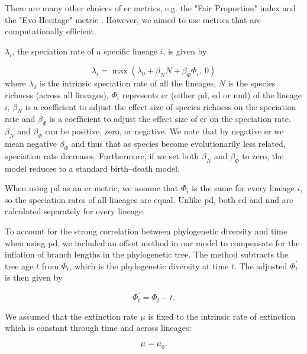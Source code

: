 {There are many other choices of \acrshort{er} metrics, e.g. the "Fair Proportion" index \citep{redding_evolutionarily_2008} and the "Evo-Heritage" metric \citep{rosindell_phylogenetic_2024}. However, we aimed to use metrics that are computationally efficient.

$\lambda_i$, the speciation rate of a specific lineage $i$, is given by

\begin{equation}
\lambda_i=\operatorname{max}{\left(\lambda_0+\beta_NN+\beta_\varPhi\varPhi_i,\ 0\right)}
\label{equation:three}
\end{equation}
where $\lambda_0$ is the intrinsic speciation rate of all the lineages, $N$ is the species richness (across all lineages), $\varPhi_i$ represents \acrshort{er} (either \acrshort{pd}, \acrshort{ed} or \acrshort{nnd}) of the lineage $i$, $\beta_N$ is a coefficient to adjust the effect size of species richness on the speciation rate and $\beta_\varPhi$ is a coefficient to adjust the effect size of \acrshort{er} on the speciation rate. $\beta_N$ and $\beta_\varPhi$ can be positive, zero, or negative. We note that by negative \acrshort{er} we mean negative $\beta_\varPhi$ and thus that as species become evolutionarily less related, speciation rate decreases. Furthermore, if we set both $\beta_N$ and $\beta_\varPhi$ to zero, the model reduces to a standard birth--death model.

When using \acrshort{pd} as an \acrshort{er} metric, we assume that $\varPhi_i$ is the same for every lineage $i$, so the speciation rates of all lineages are equal. Unlike \acrshort{pd}, both \acrshort{ed} and \acrshort{nnd} are calculated separately for every lineage.

To account for the strong correlation between phylogenetic diversity and time when using \acrshort{pd}, we included an offset method in our model to compensate for the inflation of branch lengths in the phylogenetic tree. The method subtracts the tree age $t$ from $\varPhi_t$, which is the phylogenetic diversity at time $t$. The adjusted $\varPhi_t^\prime$ is then given by

\begin{equation}
\varPhi_t^\prime=\varPhi_t-t.
\label{equation:two}
\end{equation}

We assumed that the extinction rate $\mu$ is fixed to the intrinsic rate of extinction which is constant through time and across lineages:

\begin{equation}
{\mu=\mu}_0.
\label{equation:four}
\end{equation}

}
